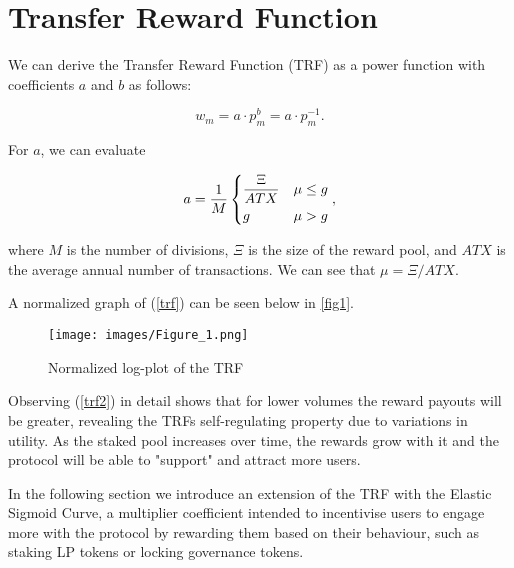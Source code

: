 \section{Transfer Reward Function}

We can derive the Transfer Reward Function (TRF) as a power function with coefficients $a$ and $b$ as follows:

\begin{equation} \label{trf}
    w_m = a\cdot p_m^b = a\cdot p_m^{-1}.
\end{equation}

For $a$, we can evaluate

\begin{equation} \label{trf2}
    a = \frac{1}{M}
    \begin{dcases}
    \frac{\Xi}{ATX} & \mu \leq g \\
    g & \mu > g
    \end{dcases},
\end{equation}

where $M$ is the number of divisions, $\Xi$ is the size of the reward pool, and $ATX$ is the average annual number of transactions. We can see that $\mu = \Xi/ATX$.


A normalized graph of (\ref{trf}) can be seen below in \autoref{fig1}. 

\begin{figure}[hb]
    \centering
    \texttt{[image: images/Figure\_1.png]}
    \caption{Normalized log-plot of the TRF} \label{fig1}
\end{figure}

Observing (\ref{trf2}) in detail shows that for lower volumes the reward payouts will be greater, revealing the TRFs self-regulating property due to variations in utility. As the staked pool increases over time, the rewards grow with it and the protocol will be able to "support" and attract more users.

In the following section we introduce an extension of the TRF with the Elastic Sigmoid Curve, a multiplier coefficient intended to incentivise users to engage more with the protocol by rewarding them based on their behaviour, such as staking LP tokens or locking governance tokens.